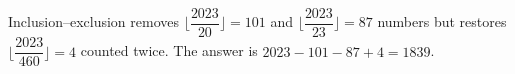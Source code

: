 Inclusion--exclusion removes $\lfloor \dfrac{2023}{20} \rfloor = 101$ and $\lfloor \dfrac{2023}{23} \rfloor = 87$ numbers but restores $\lfloor \dfrac{2023}{460} \rfloor = 4$ counted twice. The answer is $2023-101-87+4=\boxed{1839}$.
